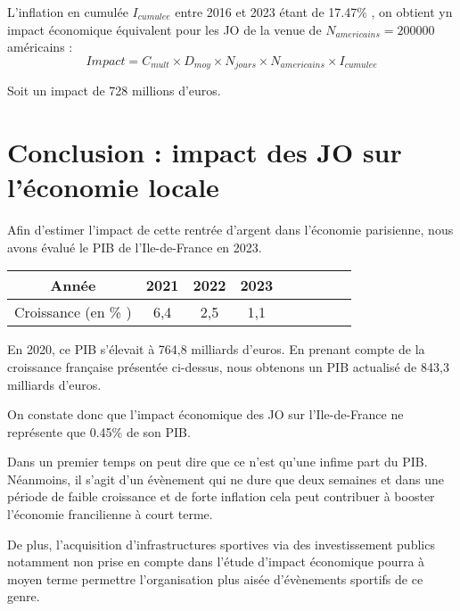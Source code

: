 \documentclass{article}
\begin{document}
  L'inflation en cumulée $I_{cumulee}$ entre 2016 et 2023 étant de 17.47\% , on obtient yn impact économique équivalent pour les JO de la venue de $N_{americains} = 200 000$ américains :
  $$ Impact = C_{mult} \times D_{moy} \times N_{jours} \times N_{americains} \times I_{cumulee}$$

  Soit un impact de 728 millions d'euros.
\section{Conclusion : impact des JO sur l'économie locale}



  Afin d'estimer l'impact de cette rentrée d'argent dans l'économie parisienne, nous avons évalué le PIB de l'Ile-de-France en 2023. 

  
  \vspace{0.5cm}
  \begin{center}
    \begin{tabular}{ | c | c | c |  c |  c |  c |  c |  c |  c | }
      \hline
      Année & 2021 & 2022 & 2023  \\ \hline
      Croissance (en \% ) & 6,4 & 2,5 & 1,1  \\ \hline
    \end{tabular}
  \end{center}
    \vspace{0.5cm}

  En 2020, ce PIB s'élevait à 764,8 milliards d'euros. En prenant compte de la croissance française présentée ci-dessus, nous obtenons un PIB actualisé de 843,3 milliards d'euros.

  On constate donc que l'impact économique des JO sur l'Ile-de-France ne représente que 0.45\% de son PIB.

  Dans un premier temps on peut dire que ce n'est qu'une infime part du PIB. Néanmoins, il s'agit d'un évènement qui ne dure que deux semaines et  dans une période de faible croissance et de forte inflation cela peut contribuer à booster l'économie francilienne à court terme. 


  De plus, l'acquisition d'infrastructures sportives via des investissement publics notamment non prise en compte dans l'étude d'impact économique pourra à moyen terme permettre l'organisation plus aisée d'évènements sportifs de ce genre.
\end{document}

